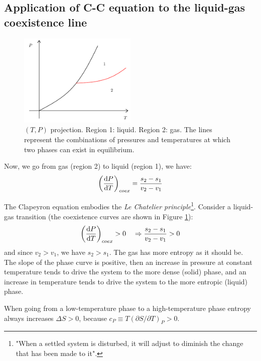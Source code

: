 \documentclass[../main/main.tex]{subfiles}
\begin{document}
\subsection{Application of C-C equation to the liquid-gas coexistence line}
\begin{figure}[h!]
\centering
\includegraphics[width=0.5\textwidth]{../lessons/3_image/16.pdf}
\caption{\label{fig:3_16} \( (T,P) \) projection. Region 1: liquid. Region 2: gas. The lines represent the combinations of pressures and temperatures at which two phases can exist in equilibrium.}
\end{figure}

 Now, we go from gas (region 2) to liquid (region 1), we have:
\begin{equation*}
  \qty(\dv{P}{T} )_{coex} = \frac{s_2 - s_1}{v_2 - v_1}
  \label{eq:}
\end{equation*}

The Clapeyron equation embodies the \emph{Le Chatelier principle}\footnote{"When a settled system is disturbed, it will adjust to diminish the change that has been made to it".}.
 Consider a liquid-gas transition (the coexistence curves are shown in Figure \ref{fig:3_16}):
\begin{equation*}
  \qty(\dv{P}{T} )_{coex} > 0 \quad \Rightarrow \frac{s_2 - s_1}{v_2 - v_1} > 0
\end{equation*}
and since \( v_2 > v_1 \), we have \( s_2 > s_1 \). The gas has more entropy as it should be.  The slope of the phase curve is positive, then an increase in pressure at constant temperature tends to drive the system to the more dense (solid) phase, and an increase in temperature tends to drive the system to the more entropic (liquid) phase.


When going from a low-temperature phase to a high-temperature phase entropy always increases \( \Delta S > 0 \), because \( c_P \equiv T (\partial{S}/\partial{T}  )_P > 0 \).
\end{document}
